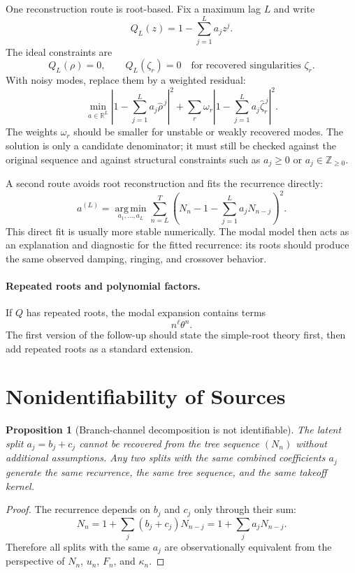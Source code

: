 \documentclass[10pt,twocolumn]{article}
\newtheorem{proposition}{Proposition}
\newcommand{\ZZ}{\mathbb{Z}}
\newcommand{\RR}{\mathbb{R}}
\newcommand{\argmin}{\operatorname*{arg\,min}}
\begin{document}
One reconstruction route is root-based. Fix a maximum lag \(L\) and write
\[
        Q_L(z)=1-\sum_{j=1}^{L}a_jz^j.
\]
The ideal constraints are
\[
        Q_L(\rho)=0,
        \qquad
        Q_L(\zeta_r)=0
        \quad \text{for recovered singularities } \zeta_r.
\]
With noisy modes, replace them by a weighted residual:
\[
        \min_{a\in\RR^L}
        \left|1-\sum_{j=1}^{L}a_j\widehat\rho^{\,j}\right|^2
        +
        \sum_r \omega_r
        \left|1-\sum_{j=1}^{L}a_j\widehat\zeta_r^{\,j}\right|^2.
\]
The weights \(\omega_r\) should be smaller for unstable or weakly recovered
modes. The solution is only a candidate denominator; it must still be checked
against the original sequence and against structural constraints such as
\(a_j\ge0\) or \(a_j\in\ZZ_{\ge0}\).

A second route avoids root reconstruction and fits the recurrence directly:
\[
        a^{(L)}
        =
        \argmin_{a_1,\ldots,a_L}
        \sum_{n=L}^{T}
        \left(
            N_n-1-\sum_{j=1}^{L}a_jN_{n-j}
        \right)^2.
\]
This direct fit is usually more stable numerically. The modal model then acts
as an explanation and diagnostic for the fitted recurrence: its roots should
produce the same observed damping, ringing, and crossover behavior.

\paragraph{Repeated roots and polynomial factors.}
If \(Q\) has repeated roots, the modal expansion contains terms
\[
        n^\ell \theta^n.
\]
The first version of the follow-up should state the simple-root theory first,
then add repeated roots as a standard extension.

\section{Nonidentifiability of Sources}

\begin{proposition}[Branch-channel decomposition is not identifiable]
The latent split \(a_j=b_j+c_j\) cannot be recovered from the tree sequence
\((N_n)\) without additional assumptions. Any two splits with the same
combined coefficients \(a_j\) generate the same recurrence, the same tree
sequence, and the same takeoff kernel.
\end{proposition}

\begin{proof}
The recurrence depends on \(b_j\) and \(c_j\) only through their sum:
\[
        N_n
        =
        1+\sum_j (b_j+c_j)N_{n-j}
        =
        1+\sum_j a_jN_{n-j}.
\]
Therefore all splits with the same \(a_j\) are observationally equivalent from
the perspective of \(N_n\), \(u_n\), \(F_n\), and \(\kappa_n\).
\end{proof}
\end{document}
